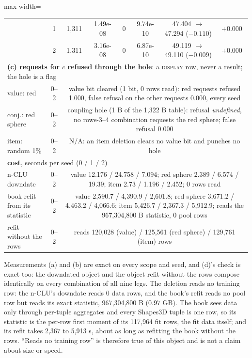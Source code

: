 \documentclass{article} %
\begin{document}
\begin{table}[t]
\begin{adjustbox}{max width=\linewidth}
\begin{tabular}{lccccccc}
 & 1 & 1,311 & 1.49e-08 & 0 & 9.74e-10 & 47.404 $\to$ 47.294 ($-0.110$) & $+0.000$ \\
 & 2 & 1,311 & 3.16e-08 & 0 & 6.87e-10 & 49.119 $\to$ 49.110 ($-0.009$) & $+0.000$ \\
\midrule
\multicolumn{8}{l}{\textbf{(c) requests for $c$ refused through the hole}: a \textsc{display} row, never a result; the hole is a flag} \\
value: red & 0--2 & \multicolumn{6}{p{10.6cm}}{value bit cleared (1 bit, 0 rows read): red requests refused 1.000, false refusal on the other requests 0.000, every seed} \\
conj.: red sphere & 0--2 & \multicolumn{6}{p{10.6cm}}{coupling hole (1 B of the 1,322 B table): refusal \emph{undefined}, no rows-3--4 combination requests the red sphere; false refusal 0.000} \\
item: random 1\% & 0--2 & \multicolumn{6}{p{10.6cm}}{N/A: an item deletion clears no value bit and punches no hole} \\
\midrule
\multicolumn{8}{l}{\textbf{cost}, seconds per seed (0 / 1 / 2)} \\
n-CLU downdate & 0--2 & \multicolumn{6}{p{10.6cm}}{value 12.176 / 24.758 / 7.094; red sphere 2.389 / 6.574 / 19.39; item 2.73 / 1.196 / 2.452; 0 rows read} \\
book refit from its statistic & 0--2 & \multicolumn{6}{p{10.6cm}}{value 2,590.7 / 4,390.9 / 2,601.8; red sphere 3,671.2 / 4,463.2 / 4,066.6; item 5,426.7 / 2,367.3 / 5,912.9; reads the 967,304,800 B statistic, 0 pool rows} \\
refit without the rows & 0--2 & \multicolumn{6}{p{10.6cm}}{reads 120,028 (value) / 125,561 (red sphere) / 129,761 (item) rows} \\
\bottomrule
\end{tabular}\end{adjustbox}
\end{table}

\noindent Measurements (a) and (b) are exact on every scope and seed, and (d)'s check is exact too:
the downdated object and the object refit without the rows compose identically on every combination of
all nine legs. The deletion reads no training row: the n-CLU's downdate reads 0 data rows, and the %
book's refit reads no pool row but reads its exact statistic, 967,304,800 B (0.97 GB). The book sees %
data only through per-tuple aggregates and every Shapes3D tuple is one row, so its statistic is the
per-row first moment of its 117,964 fit rows, the fit data itself; and its refit takes 2,367 to %
5,913 s, about as long as refitting the book without the rows. ``Reads no training row'' is %
therefore true of this object and is not a claim about size or speed.
\end{document}
